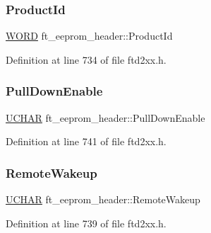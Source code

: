 \subsubsection{\texorpdfstring{Product\+Id}{ProductId}}
{\footnotesize\ttfamily \hyperlink{CatCaloProto40MHz_2inc_2WinTypes_8h_a197942eefa7db30960ae396d68339b97}{W\+O\+RD} ft\+\_\+eeprom\+\_\+header\+::\+Product\+Id}



Definition at line 734 of file ftd2xx.\+h.

\mbox{\label{structft__eeprom__header_a3a9b620423c2d0d1f452269c255f4209}} 
\subsubsection{\texorpdfstring{Pull\+Down\+Enable}{PullDownEnable}}
{\footnotesize\ttfamily \hyperlink{CatCaloProto40MHz_2inc_2WinTypes_8h_a4f4bb67531a9bf6f0b9c6ad76aeba587}{U\+C\+H\+AR} ft\+\_\+eeprom\+\_\+header\+::\+Pull\+Down\+Enable}



Definition at line 741 of file ftd2xx.\+h.

\mbox{\label{structft__eeprom__header_a923b8578325e21645cc18b54784966f4}} 
\subsubsection{\texorpdfstring{Remote\+Wakeup}{RemoteWakeup}}
{\footnotesize\ttfamily \hyperlink{CatCaloProto40MHz_2inc_2WinTypes_8h_a4f4bb67531a9bf6f0b9c6ad76aeba587}{U\+C\+H\+AR} ft\+\_\+eeprom\+\_\+header\+::\+Remote\+Wakeup}



Definition at line 739 of file ftd2xx.\+h.

\mbox{\label{structft__eeprom__header_a98fe9504d952d4d579dd8d047a70d175}} 
